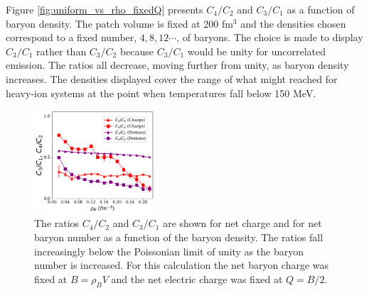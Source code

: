 Figure \ref{fig:uniform_vs_rho_fixedQ} presents $C_4/C_2$ and $C_3/C_1$ as a function of baryon density. The patch volume is fixed at 200 fm$^3$ and the densities chosen correspond to a fixed number, $4,8,12\cdots$, of baryons. The choice is made to display $C_3/C_1$ rather than $C_3/C_2$ because $C_3/C_1$ would be unity for uncorrelated emission. The ratios all decrease, moving further from unity, as baryon density increases. The densities displayed cover the range of what might reached for heavy-ion systems at the point when temperatures fall below 150 MeV. 
\begin{figure}
\centerline{\includegraphics[width=0.4\textwidth]{figs/m_vs_rho_fixedQ}}
\caption{\label{fig:uniform_vs_rho_fixed_Q}
The ratios $C_4/C_2$ and $C_3/C_1$ are shown for net charge and for net baryon number as a function of the baryon density. The ratios fall increasingly below the Poissonian limit of unity as the baryon number is increased. For this calculation the net baryon charge was fixed at $B=\rho_BV$ and the net electric charge was fixed at $Q=B/2$.}
\end{figure}

